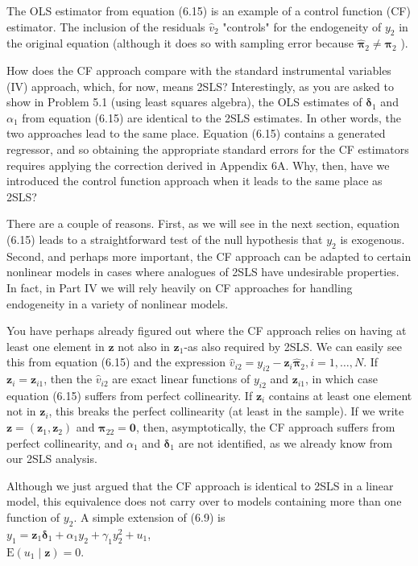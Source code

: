 \documentclass[10pt]{article}
\begin{document}
The OLS estimator from equation (6.15) is an example of a control function (CF) estimator. The inclusion of the residuals $\hat{v}_{2}$ "controls" for the endogeneity of $y_{2}$ in the original equation (although it does so with sampling error because $\hat{\boldsymbol{\pi}}_{2} \neq \boldsymbol{\pi}_{2}$ ).

How does the CF approach compare with the standard instrumental variables (IV) approach, which, for now, means 2SLS? Interestingly, as you are asked to show in Problem 5.1 (using least squares algebra), the OLS estimates of $\boldsymbol{\delta}_{1}$ and $\alpha_{1}$ from equation (6.15) are identical to the 2SLS estimates. In other words, the two approaches lead to the same place. Equation (6.15) contains a generated regressor, and so obtaining the appropriate standard errors for the CF estimators requires applying the correction derived in Appendix 6A. Why, then, have we introduced the control function approach when it leads to the same place as 2SLS?

There are a couple of reasons. First, as we will see in the next section, equation (6.15) leads to a straightforward test of the null hypothesis that $y_{2}$ is exogenous. Second, and perhaps more important, the CF approach can be adapted to certain\\
nonlinear models in cases where analogues of 2SLS have undesirable properties. In fact, in Part IV we will rely heavily on CF approaches for handling endogeneity in a variety of nonlinear models.

You have perhaps already figured out where the CF approach relies on having at least one element in $\mathbf{z}$ not also in $\mathbf{z}_{1}$-as also required by 2SLS. We can easily see this from equation (6.15) and the expression $\hat{v}_{i 2}=y_{i 2}-\mathbf{z}_{i} \hat{\boldsymbol{\pi}}_{2}, i=1, \ldots, N$. If $\mathbf{z}_{i}=\mathbf{z}_{i 1}$, then the $\hat{v}_{i 2}$ are exact linear functions of $y_{i 2}$ and $\mathbf{z}_{i 1}$, in which case equation (6.15) suffers from perfect collinearity. If $\mathbf{z}_{i}$ contains at least one element not in $\mathbf{z}_{i}$, this breaks the perfect collinearity (at least in the sample). If we write $\mathbf{z}=\left(\mathbf{z}_{1}, \mathbf{z}_{2}\right)$ and $\boldsymbol{\pi}_{22}=\mathbf{0}$, then, asymptotically, the CF approach suffers from perfect collinearity, and $\alpha_{1}$ and $\boldsymbol{\delta}_{1}$ are not identified, as we already know from our 2SLS analysis.

Although we just argued that the CF approach is identical to 2SLS in a linear model, this equivalence does not carry over to models containing more than one function of $y_{2}$. A simple extension of (6.9) is\\
$y_{1}=\mathbf{z}_{1} \boldsymbol{\delta}_{1}+\alpha_{1} y_{2}+\gamma_{1} y_{2}^{2}+u_{1}$,\\
$\mathrm{E}\left(u_{1} \mid \mathbf{z}\right)=0$.
\end{document}
